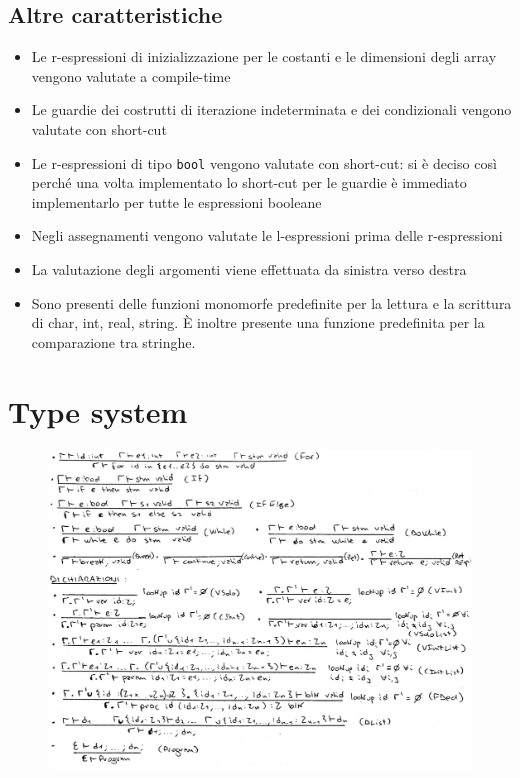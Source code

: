 \documentclass{report}
\newcommand{\term}[1]{\texttt{#1}}
\begin{document}
\section {Altre caratteristiche}

\begin{itemize}
    \item Le r-espressioni di inizializzazione per le costanti e le dimensioni degli array
        vengono valutate a compile-time
    
    \item Le guardie dei costrutti di iterazione indeterminata e dei condizionali vengono valutate
        con short-cut
    
    \item Le r-espressioni di tipo \term{bool} vengono valutate con short-cut: si è deciso così
        perché una volta implementato lo short-cut per le guardie è immediato implementarlo per
        tutte le espressioni booleane
    \item Negli assegnamenti vengono valutate le l-espressioni prima delle r-espressioni
    
    \item La valutazione degli argomenti viene effettuata da sinistra verso destra

    \item Sono presenti delle funzioni monomorfe predefinite per la lettura e la scrittura di 
        char, int, real, string. È inoltre presente una funzione predefinita per la comparazione
        tra stringhe.

\end{itemize}

\chapter {Type system}

\begin{figure}
    \centering
    \includegraphics[width = 1.2\linewidth]{typesystem2}
\end{figure}
\end{document}
